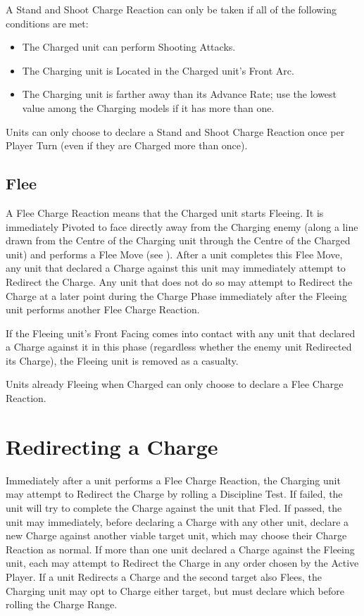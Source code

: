 A Stand and Shoot Charge Reaction can only be taken if all of the following conditions are met:

\begin{itemize}
	\item The Charged unit can perform Shooting Attacks.
	\item The Charging unit is Located in the Charged unit's Front Arc.
	\item The Charging unit is farther away than its Advance Rate; use the lowest value among the Charging models if it has more than one.
 \end{itemize}

Units can only choose to declare a Stand and Shoot Charge Reaction once per Player Turn (even if they are Charged more than once).

\subsection{Flee}

A Flee Charge Reaction means that the Charged unit starts Fleeing. It is immediately Pivoted to face directly away from the Charging enemy (along a line drawn from the Centre of the Charging unit through the Centre of the Charged unit) and performs a Flee Move (see ). After a unit completes this Flee Move, any unit that declared a Charge against this unit may immediately attempt to Redirect the Charge. Any unit that does not do so may attempt to Redirect the Charge at a later point during the Charge Phase immediately after the Fleeing unit performs another Flee Charge Reaction.

If the Fleeing unit's Front Facing comes into contact with any unit that declared a Charge against it in this phase (regardless whether the enemy unit Redirected its Charge), the Fleeing unit is removed as a casualty.

Units already Fleeing when Charged can only choose to declare a Flee Charge Reaction.

\columnbreak

\section{Redirecting a Charge}

Immediately after a unit performs a Flee Charge Reaction, the Charging unit may attempt to Redirect the Charge by rolling a Discipline Test. If failed, the unit will try to complete the Charge against the unit that Fled. If passed, the unit may immediately, before declaring a Charge with any other unit, declare a new Charge against another viable target unit, which may choose their Charge Reaction as normal. If more than one unit declared a Charge against the Fleeing unit, each may attempt to Redirect the Charge in any order chosen by the Active Player. If a unit Redirects a Charge and the second target also Flees, the Charging unit may opt to Charge either target, but must declare which before rolling the Charge Range.

